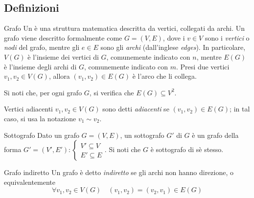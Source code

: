 \documentclass[a4paper, 12pt]{report}
\begin{document}
    \subsection{Definizioni}

    \begin{frameddefn}{Grafo}
        Un  è una struttura matematica descritta da vertici, collegati da archi. Un grafo viene descritto formalmente come $G=(V, E)$, dove i $v \in V$ sono i \textit{vertici} o \textit{nodi} del grafo, mentre gli $e \in E$ sono gli \textit{archi} (dall'inglese \textit{edges}). In particolare, $V(G)$ è l'insieme dei vertici di $G$, comunemente indicato con $n$, mentre $E(G)$ è l'insieme degli archi di $G$, comunemente indicato con $m$. Presi due vertici $v_1,v_2 \in V(G)$, allora $(v_1, v_2) \in E(G)$ è l'arco che li collega.
    \end{frameddefn}

    \begin{framedobs}{}
        Si noti che, per ogni grafo $G$, si verifica che $E(G) \subseteq V^2$.
    \end{framedobs}

    \begin{frameddefn}{Vertici adiacenti}
        $v_1, v_2 \in V(G)$ sono detti \textit{adiacenti} se $(v_1, v_2) \in E(G)$; in tal caso, si usa la notazione $v_1 \sim v_2$.
    \end{frameddefn}

    \begin{frameddefn}{Sottografo}
        Dato un grafo $G = (V, E)$, un sottografo $G'$ di $G$ è un grafo della forma $G' = (V', E'): \left \{ \begin{array}{l} V' \subseteq V \\ E' \subseteq E \end{array} \right.$. Si noti che $G$ è sottografo di sè stesso.
    \end{frameddefn}

    \begin{frameddefn}{Grafo indiretto}
        Un grafo è detto \textit{indiretto} se gli archi non hanno direzione, o equivalentemente $$\forall v_1, v_2 \in V(G) \quad (v_1, v_2) = (v_2, v_1) \in E(G)$$
    \end{frameddefn}
\end{document}
